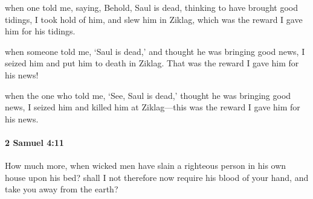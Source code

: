 			\begin{versebox}
					\item[BHS] 
					\item[ASV] when one told me, saying, Behold, Saul is dead, thinking to have brought good tidings, I took hold of him, and slew him in Ziklag, which was the reward I gave him for his tidings.
					\item[NIV] when someone told me, ‘Saul is dead,’ and thought he was bringing good news, I seized him and put him to death in Ziklag. That was the reward I gave him for his news!
					\item[NRSV] when the one who told me, ‘See, Saul is dead,’ thought he was bringing good news, I seized him and killed him at Ziklag—this was the reward I gave him for his news.
			\end{versebox}

		\paragraph{2 Samuel 4:11} %
			\label{2SAMUEL-4-11}

			How much more, when wicked men have slain a righteous person in his own house upon his bed? shall I not therefore now require his blood of your hand, and take you away from the earth?

